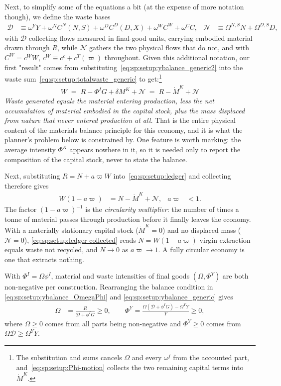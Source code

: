 Next, to simplify some of the equations a bit (at the expense of more notation though), we define the waste bases
\begin{align}
    \mathcal D &\equiv \omega^YY+\omega^{N}C^N(N,S)+\omega^{D}C^D(D,X)+\omega^WC^W+\omega^CC,
&
\mathcal N &\equiv \Omega^{N,S}N+\Omega^{D,S}D,
\label{eq:sp:setup:base}
\end{align}
with $\mathcal D$ collecting flows measured in final-good units, carrying embodied material drawn through $R$, while $\mathcal N$ gathers the two physical flows that do not, and with $C^W=c^WW$, $c^W\equiv c^c+c^T(\varpi)$ throughout. Given this additional notation, our first "result" comes from substituting~\eqref{eq:sp:setup:ybalance_generic2} into the waste sum~\eqref{eq:sp:setup:totalwaste_generic} to get:\footnote{The substitution and sums cancels $\Omega$ and every $\omega^j$ from the accounted part, and~\eqref{eq:sp:setup:Phi-motion} collects the two remaining capital terms into $\dot M^K$.}
\begin{align}
\boxed{\;W \;=\; R-\Phi^IG+\delta M^K+\mathcal N \;=\; R-\dot M^K+\mathcal N\;}
\label{eq:sp:setup:ledger}
\end{align}
\emph{Waste generated equals the material entering production, less the net accumulation of material embodied in the capital stock, plus the mass displaced from nature that never entered production at all.} That is the entire physical content of the materials balance principle for this economy, and it is what the planner's problem below is constrained by. One feature is worth marking: the average intensity $\Phi^K$ appears nowhere in it, so it is needed only to report the composition of the capital stock, never to state the balance.


Next, substituting $R=N+a\varpi W$ into~\eqref{eq:sp:setup:ledger} and collecting therefore gives
\begin{align}
W\left(1-a\varpi\right) &= N-\dot M^K+\mathcal N,
&
a\varpi&<1 .
\label{eq:sp:setup:ledger-collected}
\end{align}
The factor $\left(1-a\varpi\right)^{-1}$ is the \emph{circularity multiplier}: the number of times a tonne of material passes through production before it finally leaves the economy. With a materially stationary capital stock ($\dot M^K=0$) and no displaced mass ($\mathcal N=0$), \eqref{eq:sp:setup:ledger-collected} reads $N=W\left(1-a\varpi\right)$ virgin extraction equals waste not recycled, and $N\to0$ as $a\varpi\to1$. A fully circular economy is one that extracts nothing. 



With $\Phi^I = \Omega \phi^I$, material and waste intensities of final goods $(\Omega, \Phi^Y)$ are both non-negative per construction. Rearranging the balance condition in \eqref{eq:sp:setup:ybalance_OmegaPhi} and \eqref{eq:sp:setup:ybalance_generic} gives
\begin{align}
\Omega &= \frac{R}{\mathcal D+\phi^IG}\geq0, \qquad \Phi^Y = \frac{\Omega\left(\mathcal D + \phi^I G\right) - \Omega^Y Y}{Y}\geq0, 
\label{eq:sp:setup:Omega-phi}
\end{align}
where $\Omega\geq0$ comes from all parts being non-negative and $\Phi^Y\geq0$ comes from $\Omega \mathcal{D}\geq \Omega^Y Y$.
